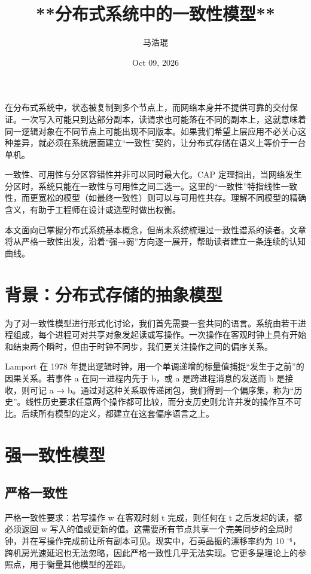 \title{**分布式系统中的一致性模型**}
\author{马浩琨}
\date{Oct 09, 2026}
\maketitle
在分布式系统中，状态被复制到多个节点上，而网络本身并不提供可靠的交付保证。一次写入可能只到达部分副本，读请求也可能落在不同的副本上，这就意味着同一逻辑对象在不同节点上可能出现不同版本。如果我们希望上层应用不必关心这种差异，就必须在系统层面建立“一致性”契约，让分布式存储在语义上等价于一台单机。\par
一致性、可用性与分区容错性并非可以同时最大化。CAP 定理指出，当网络发生分区时，系统只能在一致性与可用性之间二选一。这里的“一致性”特指线性一致性，而更宽松的模型（如最终一致性）则可以与可用性共存。理解不同模型的精确含义，有助于工程师在设计或选型时做出权衡。\par
本文面向已掌握分布式系统基本概念，但尚未系统梳理过一致性谱系的读者。文章将从严格一致性出发，沿着“强→弱”方向逐一展开，帮助读者建立一条连续的认知曲线。\par
\chapter{背景：分布式存储的抽象模型}
为了对一致性模型进行形式化讨论，我们首先需要一套共同的语言。系统由若干进程组成，每个进程可对共享对象发起读或写操作。一次操作在客观时钟上具有开始和结束两个瞬时，但由于时钟不同步，我们更关注操作之间的偏序关系。\par
Lamport 在 1978 年提出逻辑时钟，用一个单调递增的标量值捕捉“发生于之前”的因果关系。若事件 a 在同一进程内先于 b，或 a 是跨进程消息的发送而 b 是接收，则可记 a → b。通过对这种关系取传递闭包，我们得到一个偏序集，称为“历史”。线性历史要求任意两个操作都可比较，而分支历史则允许并发的操作互不可比。后续所有模型的定义，都建立在这套偏序语言之上。\par
\chapter{强一致性模型}
\section{严格一致性}
严格一致性要求：若写操作 w 在客观时刻 t 完成，则任何在 t 之后发起的读，都必须返回 w 写入的值或更新的值。这需要所有节点共享一个完美同步的全局时钟，并在写操作完成前让所有副本可见。现实中，石英晶振的漂移率约为 10 ⁻⁶，跨机房光速延迟也无法忽略，因此严格一致性几乎无法实现。它更多是理论上的参照点，用于衡量其他模型的差距。\par

